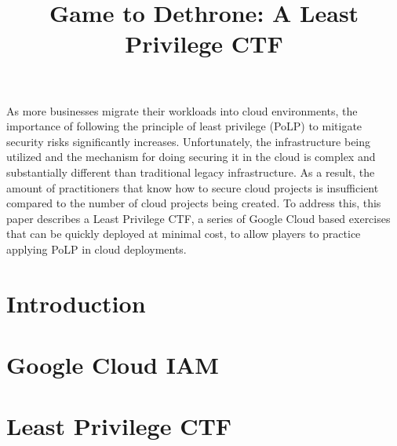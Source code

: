 \documentclass[a4paper,twoside]{article}
\begin{document}
\title{Game to Dethrone: A Least Privilege CTF}


\author{
}

\abstract
{As more businesses migrate their workloads into cloud environments, the importance of following the principle of least privilege (PoLP) to mitigate security risks significantly increases. Unfortunately, the infrastructure being utilized and the mechanism for doing securing it in the cloud is complex and substantially
different than traditional legacy infrastructure.  As a result, the amount of practitioners that know how to secure cloud projects is insufficient compared
to the number of cloud projects being created.  To address this, this paper describes a Least Privilege CTF, a series of Google Cloud based exercises that can be quickly deployed at minimal cost, to allow players to practice applying PoLP in cloud deployments.
}

\onecolumn \maketitle \normalsize \setcounter{footnote}{0} \vfill

\section{Introduction}
\label{sec:introduction}



\section{Google Cloud IAM}
\label{sec:gcpiam}


\section{Least Privilege CTF}
\label{sec:ctf}

\end{document}
